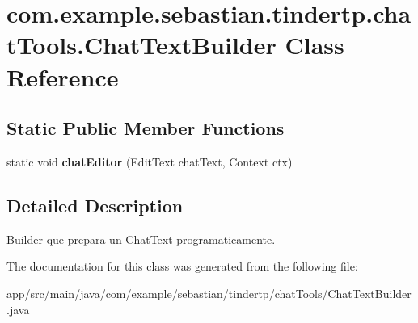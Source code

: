 \hypertarget{classcom_1_1example_1_1sebastian_1_1tindertp_1_1chatTools_1_1ChatTextBuilder}{}\section{com.\+example.\+sebastian.\+tindertp.\+chat\+Tools.\+Chat\+Text\+Builder Class Reference}
\label{classcom_1_1example_1_1sebastian_1_1tindertp_1_1chatTools_1_1ChatTextBuilder}
\subsection*{Static Public Member Functions}
\begin{DoxyCompactItemize}
\item 
static void {\bfseries chat\+Editor} (Edit\+Text chat\+Text, Context ctx)\hypertarget{classcom_1_1example_1_1sebastian_1_1tindertp_1_1chatTools_1_1ChatTextBuilder_abaaff0074ccf004a1e2fb5e258b1092c}{}\label{classcom_1_1example_1_1sebastian_1_1tindertp_1_1chatTools_1_1ChatTextBuilder_abaaff0074ccf004a1e2fb5e258b1092c}

\end{DoxyCompactItemize}


\subsection{Detailed Description}
Builder que prepara un Chat\+Text programaticamente. 

The documentation for this class was generated from the following file\+:\begin{DoxyCompactItemize}
\item 
app/src/main/java/com/example/sebastian/tindertp/chat\+Tools/Chat\+Text\+Builder.\+java\end{DoxyCompactItemize}
